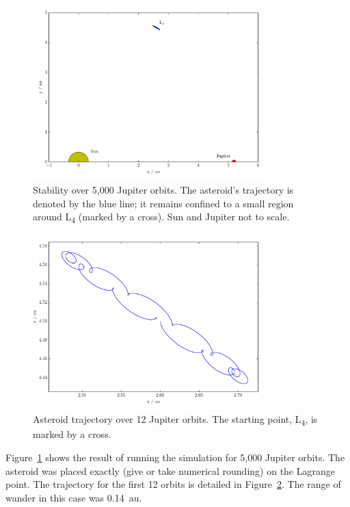 \documentclass[a4paper]{article}
\begin{document}
    \begin{figure}
      \centering
      \caption{Stability over 5,000 Jupiter orbits. The asteroid's trajectory is
      denoted by the blue line; it remains confined to a small region around
      L\textsubscript{4} (marked by a cross). Sun and Jupiter not to scale.}
      \label{fig:single}
      \includegraphics[width=0.8\textwidth]{figures/single}
    \end{figure}
    \begin{figure}
      \centering
      \caption{Asteroid trajectory over 12 Jupiter orbits. The starting point,
      L\textsubscript{4}, is marked by a cross.}
      \label{fig:typical}
      \includegraphics[width=0.8\textwidth]{figures/typical}
    \end{figure}
    Figure~\ref{fig:single} shows the result of running the simulation for
    5,000 Jupiter orbits. The asteroid was placed exactly (give or take
    numerical rounding) on the Lagrange point. The trajectory for the first 12
    orbits is detailed in Figure~\ref{fig:typical}. The range of wander in this
    case was \SI{0.14}{\astronomicalunit}.
    
\end{document}
